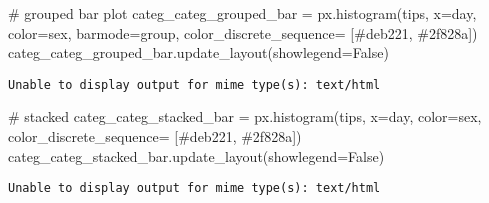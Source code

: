 \documentclass[
  letterpaper,
  DIV=11,
  numbers=noendperiod]{scrreprt}
\newenvironment{Shaded}{\begin{snugshade}}{\end{snugshade}}
\newcommand{\CommentTok}[1]{\textcolor[rgb]{0.37,0.37,0.37}{#1}}
\newcommand{\NormalTok}[1]{\textcolor[rgb]{0.00,0.23,0.31}{#1}}
\newcommand{\OperatorTok}[1]{\textcolor[rgb]{0.37,0.37,0.37}{#1}}
\newcommand{\StringTok}[1]{\textcolor[rgb]{0.13,0.47,0.30}{#1}}
\newcommand{\VariableTok}[1]{\textcolor[rgb]{0.07,0.07,0.07}{#1}}
\begin{document}
\begin{Shaded}
\begin{Highlighting}[]
\CommentTok{\# grouped bar plot}
\NormalTok{categ\_categ\_grouped\_bar }\OperatorTok{=}\NormalTok{ px.histogram(tips, x}\OperatorTok{=}\StringTok{\textquotesingle{}day\textquotesingle{}}\NormalTok{, color}\OperatorTok{=}\StringTok{\textquotesingle{}sex\textquotesingle{}}\NormalTok{, barmode}\OperatorTok{=}\StringTok{\textquotesingle{}group\textquotesingle{}}\NormalTok{, color\_discrete\_sequence}\OperatorTok{=}\NormalTok{ [}\StringTok{\textquotesingle{}\#deb221\textquotesingle{}}\NormalTok{, }\StringTok{\textquotesingle{}\#2f828a\textquotesingle{}}\NormalTok{])}
\NormalTok{categ\_categ\_grouped\_bar.update\_layout(showlegend}\OperatorTok{=}\VariableTok{False}\NormalTok{)}
\end{Highlighting}
\end{Shaded}

\begin{verbatim}
Unable to display output for mime type(s): text/html
\end{verbatim}

\begin{Shaded}
\begin{Highlighting}[]
\CommentTok{\# stacked}
\NormalTok{categ\_categ\_stacked\_bar }\OperatorTok{=}\NormalTok{ px.histogram(tips, x}\OperatorTok{=}\StringTok{\textquotesingle{}day\textquotesingle{}}\NormalTok{, color}\OperatorTok{=}\StringTok{\textquotesingle{}sex\textquotesingle{}}\NormalTok{, color\_discrete\_sequence}\OperatorTok{=}\NormalTok{ [}\StringTok{\textquotesingle{}\#deb221\textquotesingle{}}\NormalTok{, }\StringTok{\textquotesingle{}\#2f828a\textquotesingle{}}\NormalTok{])}
\NormalTok{categ\_categ\_stacked\_bar.update\_layout(showlegend}\OperatorTok{=}\VariableTok{False}\NormalTok{)}
\end{Highlighting}
\end{Shaded}

\begin{verbatim}
Unable to display output for mime type(s): text/html
\end{verbatim}
\end{document}
